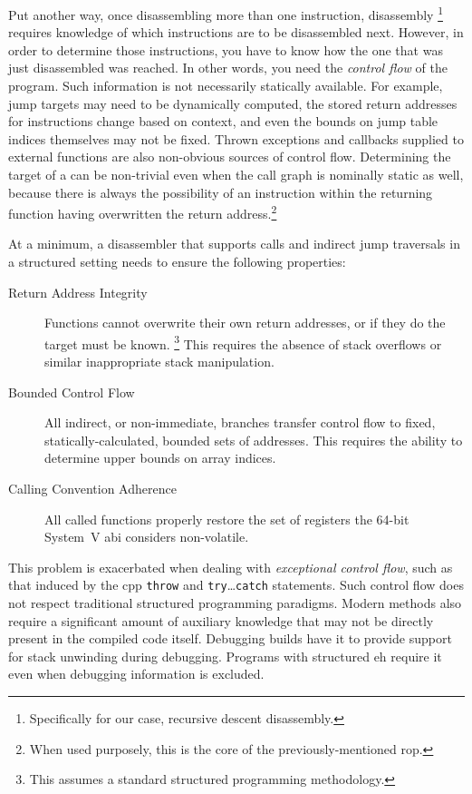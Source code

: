 Put another way, once disassembling more than one instruction, disassembly%
\footnote{Specifically for our case, recursive descent disassembly.}
requires knowledge of which instructions are to be disassembled next.
However, in order to determine those instructions, you have to know how the one that was just disassembled was reached.
In other words, you need the \emph{control flow} of the program.
Such information is not necessarily statically available. For example, jump targets may need to be dynamically computed, the stored return addresses for  instructions change based on context, and even the bounds on jump table indices themselves may not be fixed.
Thrown exceptions and callbacks supplied to external functions are also non-obvious sources of control flow.
Determining the target of a  can be non-trivial even when the call graph is nominally static as well, because there is always the possibility of an instruction within the returning function having overwritten the return address.\footnote{When used purposely, this is the core of the previously-mentioned \gls{rop}.}

At a minimum, a disassembler that supports calls and indirect jump traversals in a structured setting needs to ensure the following properties:
\begin{description}
  \item[Return Address Integrity] Functions cannot overwrite their own return addresses, or if they do the target must be known.%
  \footnote{This assumes a standard structured programming methodology.}
  This requires the absence of stack overflows or similar inappropriate stack manipulation.
  \item[Bounded Control Flow] All indirect, or non-immediate, branches transfer control flow to fixed, statically-calculated, bounded sets of addresses. This requires the ability to determine upper bounds on array indices.
  \item[Calling Convention Adherence] All called functions properly restore the set of registers the 64-bit System~V \gls{abi} considers non-volatile.
\end{description}

This problem is exacerbated when dealing with \emph{exceptional control flow}, such as that induced by the \gls{cpp} \lstinline|throw| and \lstinline|try|\dots\lstinline|catch| statements.
Such control flow does not respect traditional structured programming paradigms.
Modern methods also require a significant amount of auxiliary knowledge that may not be directly present in the compiled code itself.
Debugging builds have it to provide support for stack unwinding during debugging.
Programs with structured \gls{eh} require it even when debugging information is excluded.

